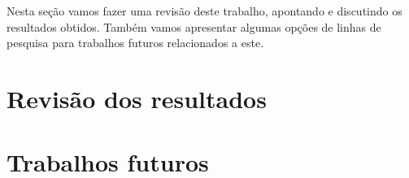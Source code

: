 Nesta seção vamos fazer uma revisão deste trabalho, apontando e 
discutindo os resultados obtidos. Também vamos apresentar algumas opções
de linhas de pesquisa para trabalhos futuros relacionados a este.
\section{Revisão dos resultados}

\section{Trabalhos futuros}
